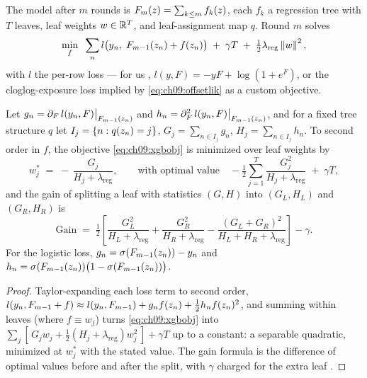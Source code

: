 The model after $m$ rounds is $F_m(z) = \sum_{k \le m}
f_k(z)$, each $f_k$ a regression tree with $T$ leaves, leaf weights
$w \in \mathbb{R}^T$, and leaf-assignment map $q$. Round $m$ solves
\begin{equation}\label{eq:ch09:xgbobj}
\min_{f} \;\; \sum_{n} l\big(y_n,\; F_{m-1}(z_n) + f(z_n)\big)
\;+\; \gamma T \;+\; \tfrac{1}{2}\lambda_{\mathrm{reg}} \left\lVert w\right\rVert^2 ,
\end{equation}
with $l$ the per-row loss --- for us ,
$l(y, F) = -y F + \log(1 + e^{F})$, or the cloglog-exposure loss implied
by \cref{eq:ch09:offsetlik} as a custom objective.

\begin{proposition}\label{prop:ch09:xgb}
Let $g_n = \partial_F\, l(y_n, F)\big|_{F_{m-1}(z_n)}$ and
$h_n = \partial^2_F\, l(y_n, F)\big|_{F_{m-1}(z_n)}$, and for a
fixed tree structure $q$ let $I_j = \{n : q(z_n) = j\}$,
$G_j = \sum_{n \in I_j} g_n$, $H_j = \sum_{n \in I_j} h_n$. To second
order in $f$, the objective \cref{eq:ch09:xgbobj} is minimized over leaf
weights by
\[
w_j^{*} \;=\; -\,\frac{G_j}{H_j + \lambda_{\mathrm{reg}}},
\qquad
\text{with optimal value}
\quad
-\tfrac{1}{2} \sum_{j=1}^{T} \frac{G_j^{2}}{H_j + \lambda_{\mathrm{reg}}}
\;+\; \gamma T,
\]
and the gain of splitting a leaf with statistics $(G, H)$ into
$(G_L, H_L)$ and $(G_R, H_R)$ is
\begin{equation}\label{eq:ch09:gain}
\mathrm{Gain} \;=\; \tfrac{1}{2}\left[
\frac{G_L^{2}}{H_L + \lambda_{\mathrm{reg}}}
+ \frac{G_R^{2}}{H_R + \lambda_{\mathrm{reg}}}
- \frac{(G_L + G_R)^{2}}{H_L + H_R + \lambda_{\mathrm{reg}}}
\right] - \gamma .
\end{equation}
For the logistic loss, $g_n = \sigma(F_{m-1}(z_n)) - y_n$ and
$h_n = \sigma(F_{m-1}(z_n))\big(1 - \sigma(F_{m-1}(z_n))\big)$.
\end{proposition}

\begin{proof}
Taylor-expanding each loss term to second order,
$l(y_n, F_{m-1} + f) \approx l(y_n, F_{m-1}) + g_n f(z_n) +
\tfrac12 h_n f(z_n)^2$, and summing within leaves (where
$f \equiv w_j$) turns \cref{eq:ch09:xgbobj} into $\sum_j [\, G_j w_j +
\tfrac12 (H_j + \lambda_{\mathrm{reg}}) w_j^2 \,] + \gamma T$ up to a
constant: a separable quadratic, minimized at $w_j^{*}$ with the stated
value. The gain formula is the difference of optimal values before and
after the split, with $\gamma$ charged for the extra leaf
\citep{chenguestrin2016}.
\end{proof}


